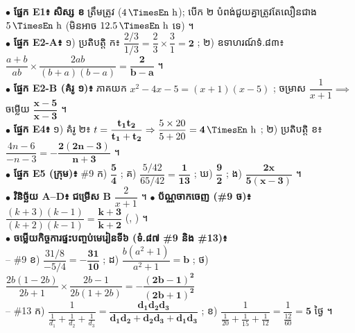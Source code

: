 \documentclass[a4paper,10pt]{article}
\newcommand{\en}[1]{{\TimesEn #1}}
\newcommand{\unit}[1]{\,\text{\en{#1}}}
\newcommand{\cnum}[1]{\mbox{\fontsize{10pt}{12pt}\selectfont\ding{\numexpr181+#1\relax}}}
\begin{document}
\begin{tcolorbox}[
  enhanced, sharp corners, colback=white, colframe=black,
  boxrule=0.85pt, boxsep=3pt, top=5pt, bottom=5pt, left=6pt, right=6pt
]
  $\bullet$ \textbf{ផ្នែក \en{E1}៖} \textbf{សិស្ស ខ} ត្រឹមត្រូវ ($4\unit{h}$); បើក ២ បំពង់ជួយគ្នាត្រូវតែលឿនជាង $5\unit{h}$ (មិនអាច $12.5\unit{h}$ ទេ) ។\\[3pt]
  $\bullet$ \textbf{ផ្នែក \en{E2-A}៖} ១) ប្រតិបត្តិ ក៖ $\dfrac{2/3}{1/3} = \dfrac{2}{3}\times\dfrac{3}{1} = \mathbf{2}$ \quad ; \quad ២) ឧទាហរណ៍ទំ.៨៣៖ $\dfrac{a+b}{ab}\times\dfrac{2ab}{(b+a)(b-a)} = \mathbf{\dfrac{2}{b - a}}$ ។\\[3pt]
  $\bullet$ \textbf{ផ្នែក \en{E2-B} (គំរូ ១)៖} ភាគយក $x^2 - 4x - 5 = (x+1)(x-5)$ ; ចម្រាស $\dfrac{1}{x+1} \implies$ ចម្លើយ $\mathbf{\dfrac{x - 5}{x - 3}}$ ។\\[3pt]
  $\bullet$ \textbf{ផ្នែក \en{E4}៖} ១) គំរូ ២៖ $t = \mathbf{\dfrac{t_1 t_2}{t_1 + t_2}} \Rightarrow \dfrac{5 \times 20}{5 + 20} = \mathbf{4\unit{h}}$ \quad ; \quad ២) ប្រតិបត្តិ ខ៖ $\dfrac{4n - 6}{-n - 3} = \mathbf{-\dfrac{2(2n - 3)}{n + 3}}$ ។\\[3pt]
  $\bullet$ \textbf{ផ្នែក \en{E5} (ក្រុម)៖} \en{\#9} ក) $\mathbf{\dfrac{5}{4}}$ ; គ) $\dfrac{5/42}{65/42} = \mathbf{\dfrac{1}{13}}$ ; ឃ) $\mathbf{\dfrac{9}{2}}$ ; ង) $\mathbf{\dfrac{2x}{5(x - 3)}}$ ។\\[3pt]
  $\bullet$ \textbf{វិនិច្ឆ័យ \en{A--D}៖} \textbf{ជម្រើស \en{B}} $\dfrac{2}{x + 1}$ ។ \quad $\bullet$ \textbf{ប័ណ្ណចាកចេញ (\en{\#9} ច)៖} $\dfrac{(k+3)(k-1)}{(k+2)(k-1)} = \mathbf{\dfrac{k + 3}{k + 2}}$ (\cnum{2}, \cnum{4}) ។\\[3pt]
  $\bullet$ \textbf{ចម្លើយកិច្ចការផ្ទះបញ្ចប់មេរៀនទី៦ (ទំ.៨៧ \en{\#9} និង \en{\#13})៖}\\[2pt]
  \hspace*{0.4em}– \en{\#9} ខ) $\dfrac{31/8}{-5/4} = \mathbf{-\dfrac{31}{10}}$ \quad ; \quad \en{\#9} ដ) $\dfrac{b(a^2+1)}{a^2+1} = \mathbf{b}$ \quad ; \quad \en{\#9} ថ) $\dfrac{2b(1-2b)}{2b+1}\times\dfrac{2b-1}{2b(1+2b)} = \mathbf{-\dfrac{(2b - 1)^2}{(2b + 1)^2}}$\\[2pt]
  \hspace*{0.4em}– \en{\#13} ក) $\dfrac{1}{\frac{1}{d_1} + \frac{1}{d_2} + \frac{1}{d_3}} = \mathbf{\dfrac{d_1 d_2 d_3}{d_1 d_2 + d_2 d_3 + d_1 d_3}}$ \quad ; \quad ខ) $\dfrac{1}{\frac{1}{20} + \frac{1}{15} + \frac{1}{12}} = \dfrac{1}{\frac{12}{60}} = \mathbf{5\text{ ថ្ងៃ}}$ ។
\end{tcolorbox}
\end{document}
